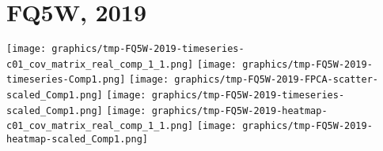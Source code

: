 
\section{FQ5W, 2019}
\setcounter{theorem}{0}

\renewcommand{\theenumi}{\roman{enumi}}
\renewcommand{\labelenumi}{\textnormal{(\theenumi)}$\;\;$}


\begin{center}
\begin{minipage}{7.0in}
\texttt{[image: graphics/tmp-FQ5W-2019-timeseries-c01\_cov\_matrix\_real\_comp\_1\_1.png]}
\quad
\texttt{[image: graphics/tmp-FQ5W-2019-timeseries-Comp1.png]}
\vskip 0.5cm
\texttt{[image: graphics/tmp-FQ5W-2019-FPCA-scatter-scaled\_Comp1.png]}
\quad
\texttt{[image: graphics/tmp-FQ5W-2019-timeseries-scaled\_Comp1.png]}
\vskip 0.5cm
\texttt{[image: graphics/tmp-FQ5W-2019-heatmap-c01\_cov\_matrix\_real\_comp\_1\_1.png]}
\quad
\texttt{[image: graphics/tmp-FQ5W-2019-heatmap-scaled\_Comp1.png]}
\end{minipage}
\end{center}


\renewcommand{\theenumi}{\roman{enumi}}
\renewcommand{\labelenumi}{\textnormal{(\theenumi)}$\;\;$}

